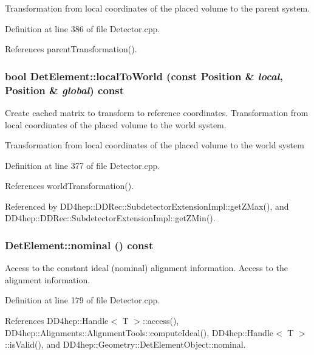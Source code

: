 Transformation from local coordinates of the placed volume to the parent system. 

Definition at line 386 of file Detector.cpp.

References parentTransformation().\hypertarget{class_d_d4hep_1_1_geometry_1_1_det_element_abb53b2600f4c47e3b1b8b0d7e8c25028}{
\subsubsection[{localToWorld}]{\setlength{\rightskip}{0pt plus 5cm}bool DetElement::localToWorld (const {\bf Position} \& {\em local}, \/  {\bf Position} \& {\em global}) const}}
\label{class_d_d4hep_1_1_geometry_1_1_det_element_abb53b2600f4c47e3b1b8b0d7e8c25028}


Create cached matrix to transform to reference coordinates. Transformation from local coordinates of the placed volume to the world system.

Transformation from local coordinates of the placed volume to the world system 

Definition at line 377 of file Detector.cpp.

References worldTransformation().

Referenced by DD4hep::DDRec::SubdetectorExtensionImpl::getZMax(), and DD4hep::DDRec::SubdetectorExtensionImpl::getZMin().\hypertarget{class_d_d4hep_1_1_geometry_1_1_det_element_af5c8d93fa7327838eee4911721f7fe2e}{
\subsubsection[{nominal}]{ DetElement::nominal () const}}
\label{class_d_d4hep_1_1_geometry_1_1_det_element_af5c8d93fa7327838eee4911721f7fe2e}


Access to the constant ideal (nominal) alignment information. Access to the alignment information. 

Definition at line 179 of file Detector.cpp.

References DD4hep::Handle$<$ T $>$::access(), DD4hep::Alignments::AlignmentTools::computeIdeal(), DD4hep::Handle$<$ T $>$::isValid(), and DD4hep::Geometry::DetElementObject::nominal.

